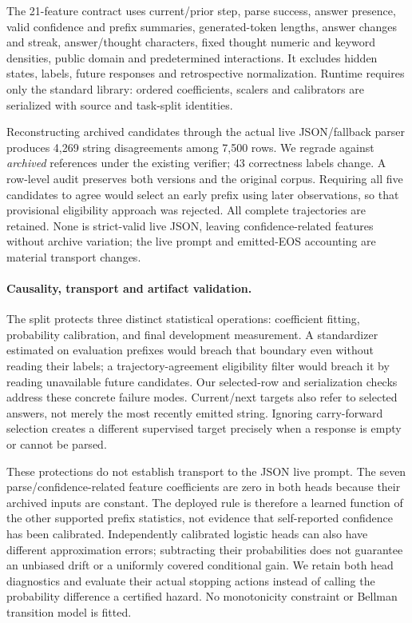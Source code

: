 \documentclass{article}
\begin{document}
The 21-feature contract uses current/prior step, parse success, answer presence,
valid confidence and prefix summaries, generated-token lengths, answer changes
and streak, answer/thought characters, fixed thought numeric and keyword
densities, public domain and predetermined interactions. It excludes hidden
states, labels, future responses and retrospective normalization. Runtime
requires only the standard library: ordered coefficients, scalers and
calibrators are serialized with source and task-split identities.

Reconstructing archived candidates through the actual live JSON/fallback parser
produces 4,269 string disagreements among 7,500 rows. We regrade against
\emph{archived} references under the existing verifier; 43 correctness labels
change. A row-level audit preserves both versions and the original corpus.
Requiring all five candidates to agree would select an early prefix using
later observations, so that provisional eligibility approach was rejected.
All complete trajectories are retained. None is strict-valid live JSON,
leaving confidence-related features without archive variation; the live prompt
and emitted-EOS accounting are material transport changes.

\paragraph{Causality, transport and artifact validation.}
The split protects three distinct statistical operations: coefficient fitting,
probability calibration, and final development measurement. A standardizer
estimated on evaluation prefixes would breach that boundary even without
reading their labels; a trajectory-agreement eligibility filter would breach
it by reading unavailable future candidates. Our selected-row and
serialization checks address these concrete failure modes. Current/next targets
also refer to selected answers, not merely the most recently emitted string.
Ignoring carry-forward selection creates a different supervised target precisely
when a response is empty or cannot be parsed.

These protections do not establish transport to the JSON live prompt.
The seven parse/confidence-related feature coefficients are zero in both
heads because their archived inputs are constant. The deployed rule is therefore
a learned function of the other supported prefix statistics, not evidence that
self-reported confidence has been calibrated. Independently calibrated
logistic heads can also have different approximation errors; subtracting their
probabilities does not guarantee an unbiased drift or a uniformly covered
conditional gain. We retain both head diagnostics and evaluate their actual
stopping actions instead of calling the probability difference a certified
hazard. No monotonicity constraint or Bellman transition model is fitted.
\end{document}
